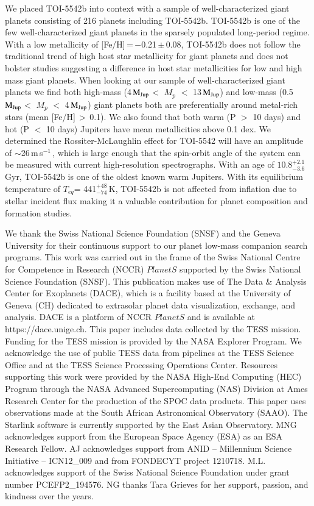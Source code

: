 \documentclass{aa}
\newcommand{\feh}{\mbox{[Fe/H]}\xspace}
\newcommand{\ms}{\mbox{m\,s$^{-1}$}}
\newcommand{\mjup}{\mbox{$\mathrm{M_{\rm Jup}}$}\xspace}
\begin{document}
We placed TOI-5542b into context with a sample of well-characterized giant planets consisting of 216 planets including TOI-5542b. TOI-5542b is one of the few well-characterized giant planets in the sparsely populated long-period regime. With a low metallicity of \feh\,=\,$-$0.21\,$\pm$\,0.08, TOI-5542b does not follow the traditional trend of high host star metallicity for giant planets and does not bolster studies suggesting a difference in host star metallicities for low and high mass giant planets. When looking at our sample of well-characterized giant planets we find both high-mass (4\,\mjup $<$ $M_{p}$ $<$ 13\,\mjup) and low-mass (0.5\,\mjup $<$ $M_{p}$ $<$ 4\,\mjup) giant planets both are preferentially around metal-rich stars (mean \feh\,$>$\,0.1). We also found that both warm (P $>$ 10 days) and hot (P $<$ 10 days) Jupiters have mean metallicities above 0.1 dex. We determined the Rossiter-McLaughlin effect for TOI-5542 will have an amplitude of $\sim$26\,\ms\,, which is large enough that the spin-orbit angle of the system can be measured with current high-resolution spectrographs. With an age of $10.8^{+2.1}_{-3.6}$\,Gyr, TOI-5542b is one of the oldest known warm Jupiters. With its equilibrium temperature of $T_{eq}$= 441$^{+48}_{-74}$\,K, TOI-5542b is not affected from inflation due to stellar incident flux making it a valuable contribution for planet composition and formation studies. 

\begin{acknowledgements}
We thank the Swiss National Science Foundation (SNSF) and the Geneva University for their continuous support to our planet low-mass companion search programs. This work was carried out in the frame of the Swiss National Centre for Competence in Research (NCCR) $PlanetS$ supported by the Swiss National Science Foundation (SNSF). This publication makes use of The Data \& Analysis Center for Exoplanets (DACE), which is a facility based at the University of Geneva (CH) dedicated to extrasolar planet data visualization, exchange, and analysis. DACE is a platform of NCCR $PlanetS$ and is available at https://dace.unige.ch. This paper includes data collected by the TESS mission. Funding for the TESS mission is provided by the NASA Explorer Program. We acknowledge the use of public TESS data from pipelines at the TESS Science Office and at the TESS Science Processing Operations Center. Resources supporting this work were provided by the NASA High-End Computing (HEC) Program through the NASA Advanced Supercomputing (NAS) Division at Ames Research Center for the production of the SPOC data products. This paper uses observations made
at the South African Astronomical Observatory (SAAO). The {\sc Starlink} software \citep{Currie2014} is currently supported by the East Asian Observatory.
MNG acknowledges support from the European Space Agency (ESA) as an ESA Research Fellow.
AJ acknowledges support from ANID -- Millennium  Science  Initiative -- ICN12\_009 and from FONDECYT project 1210718. M.L. acknowledges support of the Swiss National Science Foundation under grant number PCEFP2\_194576.
NG thanks Tara Grieves for her support, passion, and kindness over the years.


\end{acknowledgements}
\end{document}
